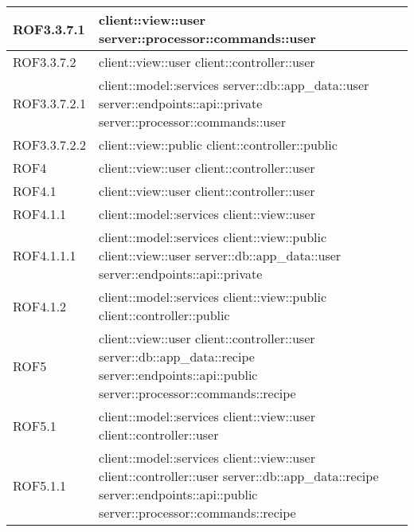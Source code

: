 \begin{center}
\begin{longtable}{| p{4cm} | p{8cm} |}
\hline
ROF3.3.7.1 & client::view::user \newline server::processor::commands::user \\
\hline
ROF3.3.7.2 & client::view::user \newline client::controller::user \\
\hline
ROF3.3.7.2.1 & client::model::services \newline server::db::app\_data::user \newline server::endpoints::api::private \newline server::processor::commands::user \\
\hline
ROF3.3.7.2.2 & client::view::public \newline client::controller::public \\
\hline
ROF4 & client::view::user \newline client::controller::user \\
\hline
ROF4.1 & client::view::user \newline client::controller::user \\
\hline
ROF4.1.1 & client::model::services \newline client::view::user \\
\hline
ROF4.1.1.1 & client::model::services \newline client::view::public \newline client::view::user \newline server::db::app\_data::user \newline server::endpoints::api::private \\
\hline
ROF4.1.2 & client::model::services \newline client::view::public \newline client::controller::public \\
\hline
ROF5 & client::view::user \newline client::controller::user \newline server::db::app\_data::recipe \newline server::endpoints::api::public \newline server::processor::commands::recipe \\
\hline
ROF5.1 & client::model::services \newline client::view::user \newline client::controller::user \\
\hline
ROF5.1.1 & client::model::services \newline client::view::user \newline client::controller::user \newline server::db::app\_data::recipe \newline server::endpoints::api::public \newline server::processor::commands::recipe \\

\end{longtable}
\end{center}
